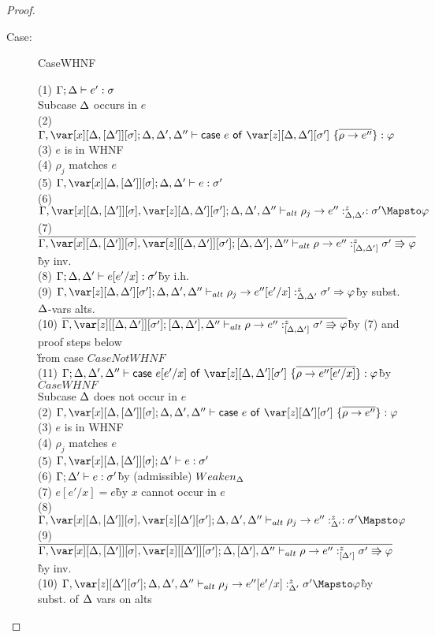 \begin{proof}
\begin{description}
\item[Case:] CaseWHNF
\begin{tabbing}
    (1) $\Gamma; \Delta \vdash e' : \sigma$\\
    Subcase $\Delta$ occurs in $e$\\
    (2) $\G,\xD;\D,\D',\D'' \vdash \ccase{e}{\z[\D,\D'][\s']~\{\ov{\rho \to e''}\}} : \vp$\\
    (3) $e$ is in WHNF\\
    (4) $\rho_j$ matches $e$\\
    (5) $\G,\xD;\D,\D' \vdash e : \s'$\\
    (6) $\G,\xD,\z[\D,\D'][\s']; \D,\D',\D'' \vdash_{alt} \rho_j \to e'' :^z_{\D,\D'} : \s' \Mapsto \vp$\\
    (7) $\ov{\G,\xD,\z[\irr{\D,\D'}][\s']; [\D,\D'],\D'' \vdash_{alt} \rho \to e'' :^z_{\irr{\D,\D'}} \s'\Rrightarrow\vp}$\` by inv.\\
    (8) $\Gamma;\Delta,\Delta' \vdash e[e'/x] : \sigma'$\` by i.h.\\
    (9) $\G,\z[\D,\D'][\s']; \D,\D',\D'' \vdash_{alt} \rho_j \to e''[e'/x] :^z_{\D,\D'} \s' \Rightarrow \vp$\` by subst. $\Delta$-vars alts.\\
    (10) $\ov{\G,\z[\irr{\D,\D'}][\s']; [\D,\D'],\D'' \vdash_{alt} \rho \to e'' :^z_{\irr{\D,\D'}} \s'\Rrightarrow\vp}$\` by (7) and proof steps below\\\`from case $CaseNotWHNF$\\
    (11) $\G;\D,\D',\D'' \vdash \ccase{e[e'/x]}{\z[\D,\D'][\s']~\{\ov{\rho \to e''[e'/x]}\}} : \vp$\` by $CaseWHNF$\\
    Subcase $\Delta$ does not occur in $e$\\
    (2) $\G,\xD;\D,\D',\D'' \vdash \ccase{e}{\z[\D'][\s']~\{\ov{\rho \to e''}\}} : \vp$\\
    (3) $e$ is in WHNF\\
    (4) $\rho_j$ matches $e$\\
    (5) $\G,\xD;\D' \vdash e : \s'$\\
    (6) $\Gamma;\Delta' \vdash e : \sigma'$\` by (admissible) $Weaken_\Delta$\\
    (7) $e[e'/x] = e$\` by $x$ cannot occur in $e$\\
    (8) $\G,\xD,\z[\D'][\s']; \D,\D',\D'' \vdash_{alt} \rho_j \to e'' :^z_{\D'} : \s' \Mapsto \vp$\\
    (9) $\ov{\G,\xD,\z[\irr{\D'}][\s']; \D,[\D'],\D'' \vdash_{alt} \rho \to e'' :^z_{\irr{\D'}} \s'\Rrightarrow\vp}$\` by inv.\\
    (10) $\G,\z[\D'][\s']; \D,\D',\D'' \vdash_{alt} \rho_j \to e''[e'/x] :^z_{\D'} \s' \Mapsto \vp$\` by subst. of $\Delta$ vars on alts\\

\end{tabbing}
\end{description}
\end{proof}
